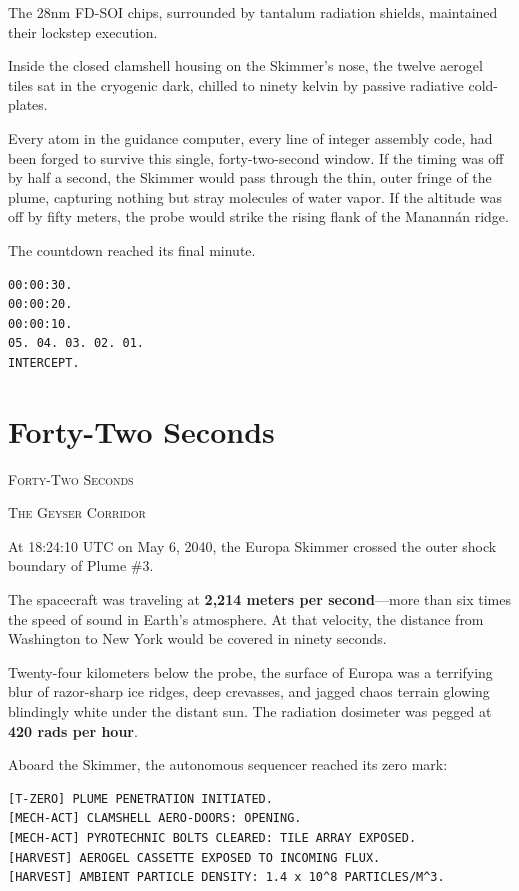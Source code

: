 \documentclass[12pt,twoside,openright]{book}
\newcommand{\sceneheader}[1]{%
  \par\vspace{1.8em}%
  {\noindent\centering\scshape\large #1\par}%
  \vspace{1.0em}%
  \noindent%
}
\begin{document}
The 28nm FD-SOI chips, surrounded by tantalum radiation shields,
maintained their lockstep execution.

Inside the closed clamshell housing on the Skimmer's nose, the twelve
aerogel tiles sat in the cryogenic dark, chilled to ninety kelvin by
passive radiative cold-plates.

Every atom in the guidance computer, every line of integer assembly
code, had been forged to survive this single, forty-two-second window.
If the timing was off by half a second, the Skimmer would pass through
the thin, outer fringe of the plume, capturing nothing but stray
molecules of water vapor. If the altitude was off by fifty meters, the
probe would strike the rising flank of the Manannán ridge.

The countdown reached its final minute.

\begin{lstlisting}
00:00:30.
00:00:20.
00:00:10.
05. 04. 03. 02. 01.
INTERCEPT.
\end{lstlisting}

\chapter{Forty-Two Seconds}
\sceneheader{Forty-Two Seconds}

\sceneheader{The Geyser Corridor}

At 18:24:10 UTC on May 6, 2040, the Europa Skimmer crossed the outer
shock boundary of Plume \#3.

The spacecraft was traveling at \textbf{2,214 meters per second}---more
than six times the speed of sound in Earth's atmosphere. At that
velocity, the distance from Washington to New York would be covered in
ninety seconds.

Twenty-four kilometers below the probe, the surface of Europa was a
terrifying blur of razor-sharp ice ridges, deep crevasses, and jagged
chaos terrain glowing blindingly white under the distant sun. The
radiation dosimeter was pegged at \textbf{420 rads per hour}.

Aboard the Skimmer, the autonomous sequencer reached its zero mark:

\begin{lstlisting}
[T-ZERO] PLUME PENETRATION INITIATED.
[MECH-ACT] CLAMSHELL AERO-DOORS: OPENING.
[MECH-ACT] PYROTECHNIC BOLTS CLEARED: TILE ARRAY EXPOSED.
[HARVEST] AEROGEL CASSETTE EXPOSED TO INCOMING FLUX.
[HARVEST] AMBIENT PARTICLE DENSITY: 1.4 x 10^8 PARTICLES/M^3.
\end{lstlisting}
\end{document}
